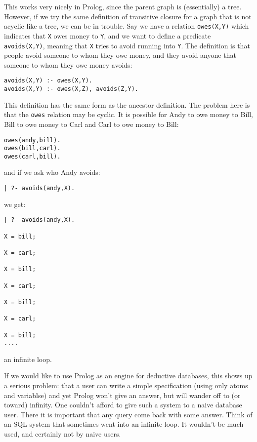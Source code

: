 This works very nicely in Prolog, since the parent graph is
(essentially) a tree.  However, if we try the same definition of
transitive closure for a graph that is not acyclic like a tree, we can
be in trouble.  Say we have a relation \verb|owes(X,Y)| which
indicates that \verb|X| owes money to \verb|Y|, and we want to define
a predicate
\verb|avoids(X,Y)|, meaning that \verb|X| tries to avoid running into
\verb|Y|.  The definition is that people avoid someone to whom they
owe money, and they avoid anyone that someone to whom they owe money
avoids:
\begin{verbatim}
avoids(X,Y) :- owes(X,Y).
avoids(X,Y) :- owes(X,Z), avoids(Z,Y).
\end{verbatim}
This definition has the same form as the ancestor definition.  The
problem here is that the \verb|owes| relation may be cyclic.  It is
possible for Andy to owe money to Bill, Bill to owe money to Carl and
Carl to owe money to Bill:
\begin{verbatim}
owes(andy,bill).
owes(bill,carl).
owes(carl,bill).
\end{verbatim}
and if we ask who Andy avoids:
\begin{verbatim}
| ?- avoids(andy,X).
\end{verbatim}
we get:
\begin{verbatim}
| ?- avoids(andy,X).

X = bill;

X = carl;

X = bill;

X = carl;

X = bill;

X = carl;

X = bill;
....
\end{verbatim}
an infinite loop.

If we would like to use Prolog as an engine for deductive databases,
this shows up a serious problem: that a user can write a simple
specification (using only atoms and variablse) and yet Prolog won't
give an answer, but will wander off to (or toward) infinity.  One
couldn't afford to give such a system to a naive database user.  There
it is important that any query come back with some answer.  Think of
an SQL system that sometimes went into an infinite loop.  It wouldn't
be much used, and certainly not by naive users.

